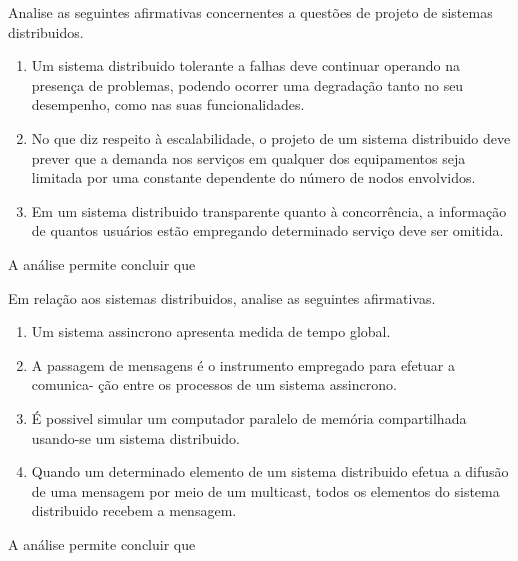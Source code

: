 \documentclass[10pt,a4paper]{article}
\begin{document}
{
\def\AMCbeginQuestion#1#2{\par\noindent{\bf (POSCOMP 2007 - Questão 69)}}
\begin{question}{}Analise as seguintes afirmativas concernentes a questões de projeto de sistemas
distribuidos.
\begin{enumerate}[label=\Roman*.]
\item Um sistema distribuido tolerante a falhas deve continuar operando na presença
de problemas, podendo ocorrer uma degradação tanto no seu desempenho, como
nas suas funcionalidades.
\item No que diz respeito à escalabilidade, o projeto de um sistema distribuido deve
prever que a demanda nos serviços em qualquer dos equipamentos seja limitada
por uma constante dependente do número de nodos envolvidos.
\item Em um sistema distribuido transparente quanto à concorrência, a informação de
quantos usuários estão empregando determinado serviço deve ser omitida.
\end{enumerate}
A análise permite concluir que
\begin{choices}
\end{choices}
\end{question}
}

{
\def\AMCbeginQuestion#1#2{\par\noindent{\bf (POSCOMP 2007 - Questão 70)}}
\begin{question}{}Em relação aos sistemas distribuidos, analise as seguintes afirmativas.
\begin{enumerate}[label=\Roman*.]
\item Um sistema assincrono apresenta medida de tempo global.
\item A passagem de mensagens é o instrumento empregado para efetuar a comunica-
ção entre os processos de um sistema assincrono.
\item É possivel simular um computador paralelo de memória compartilhada usando-se
um sistema distribuido.
\item Quando um determinado elemento de um sistema distribuido efetua a difusão
de uma mensagem por meio de um multicast, todos os elementos do sistema
distribuido recebem a mensagem.
\end{enumerate}
A análise permite concluir que
\begin{choices}
\end{choices}
\end{question}
}
\end{document}
